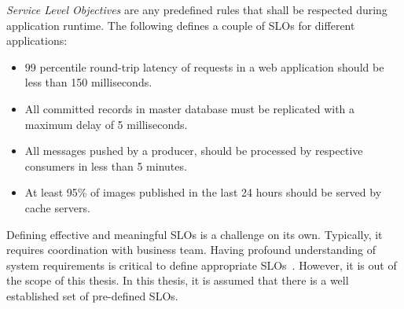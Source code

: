 \emph{Service Level Objectives} are any predefined rules that shall be respected during application runtime. The following defines a couple of SLOs for different applications:
\begin{itemize}
    \item 99 percentile round-trip latency of requests in a web application should be less than 150 milliseconds.
    \item All committed records in master database must be replicated with a maximum delay of 5 milliseconds.
    \item All messages pushed by a producer, should be processed by respective consumers in less than 5 minutes.
    \item At least 95\% of images published in the last 24 hours should be served by cache servers.
\end{itemize}
Defining effective and meaningful SLOs is a challenge on its own. Typically, it requires coordination with business team. Having profound understanding of system requirements is critical to define appropriate SLOs~\cite{Walter:2017}. However, it is out of the scope of this thesis. In this thesis, it is assumed that there is a well established set of pre-defined SLOs.

